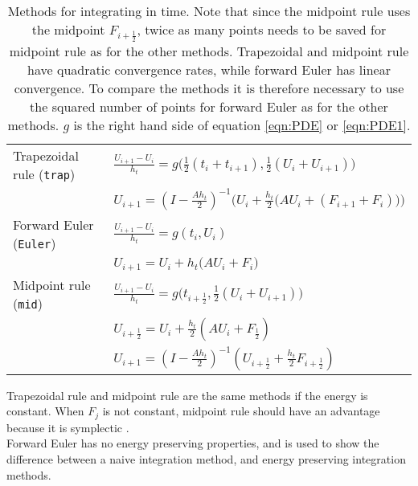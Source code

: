 \begin{table}

\caption{Methods for integrating in time. Note that since the midpoint rule uses the midpoint $F_{i+\frac{1}{2}}$, twice as many points needs to be saved for midpoint rule as for the other methods. Trapezoidal and midpoint rule have quadratic convergence rates, while forward Euler has linear convergence. To compare the methods it is therefore necessary to use the squared number of points for forward Euler as for the other methods. $g$ is the right hand side of equation \eqref{eqn:PDE} or \eqref{eqn:PDE1}.}
\centering
\begin{tabular}{l l}
	Trapezoidal rule (\texttt{trap}) \cite{trapezoidal} & $ \frac{U_{i+1} - U_{i}}{h_t} = g \Big( \frac{1}{2}(t_i+t_{i+1}),\frac{1}{2}(U_i+U_{i+1}) \Big)$
	\\ & $U_{i+1} = (I- \frac{A h_t}{2}) ^{-1} \Big(  U_i + \frac{h_t}{2} \big( A U_i+(F_{i+1}+F_i) \big)  \Big) $\\
\hline	
	Forward Euler (\texttt{Euler}) \cite{forwardeuler} & $ \frac{U_{i+1} - U_{i}}{h_t} = g ( t_i, U_i ) $ \\ & $ U_{i+1} = U_i + h_t \big( A U_i + F_i \big) $ \\
	\hline
	Midpoint rule (\texttt{mid}) \cite{midpoint} & $ \frac{U_{i+1} - U_{i}}{h_t} =  g \Big(  t_{i+\frac{1}{2}} , \frac{1}{2}(U_i + U_{i+1})    \Big) $ \\ & 
	$U_{i+\frac{1}{2}} = U_i + \frac{h_t}{2} ( A U_i + F_{\frac{1}{2}} )$ \\ &
    $U_{i+1} = (I-\frac{A h_t}{2}) ^{-1} (U_{i+\frac{1}{2}} + \frac{h_t}{2} F_{i+ \frac{1}{2}})$
    
    
\end{tabular}


\label{tab:intmet}
\end{table}
\noindent Trapezoidal rule and midpoint rule are the same methods if the energy is constant. When $F_j$  is not constant, midpoint rule should have an advantage because it is symplectic \cite{symplecticintegrator}. \\

\noindent Forward Euler has no energy preserving properties, and is used to show the difference between a naive integration method, and energy preserving integration methods. \\

